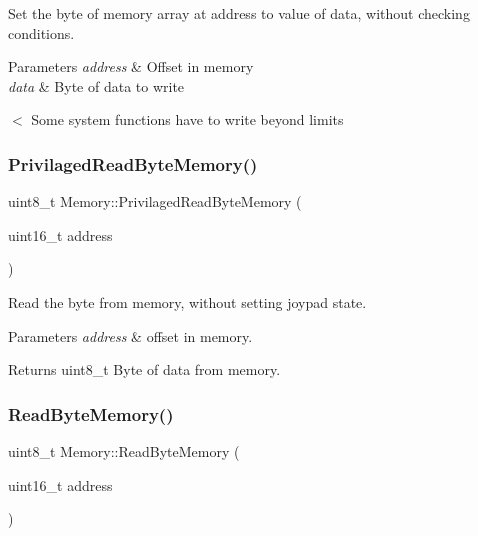 Set the byte of memory array at address to value of data, without checking conditions. 


\begin{DoxyParams}{Parameters}
{\em address} & Offset in memory \\
\hline
{\em data} & Byte of data to write \\
\hline
\end{DoxyParams}
$<$ Some system functions have to write beyond limits \mbox{\label{classMemory_a564d7bb2a8fc303f95af1a02756b882e}} 
\subsubsection{\texorpdfstring{Privilaged\+Read\+Byte\+Memory()}{PrivilagedReadByteMemory()}}
{\footnotesize\ttfamily uint8\+\_\+t Memory\+::\+Privilaged\+Read\+Byte\+Memory (\begin{DoxyParamCaption}\item[{uint16\+\_\+t}]{address }\end{DoxyParamCaption})}



Read the byte from memory, without setting joypad state. 


\begin{DoxyParams}{Parameters}
{\em address} & offset in memory. \\
\hline
\end{DoxyParams}
\begin{DoxyReturn}{Returns}
uint8\+\_\+t Byte of data from memory. 
\end{DoxyReturn}
\mbox{\label{classMemory_a2f04d90cf6d05ab12b52c1d6aef862a4}} 
\subsubsection{\texorpdfstring{Read\+Byte\+Memory()}{ReadByteMemory()}}
{\footnotesize\ttfamily uint8\+\_\+t Memory\+::\+Read\+Byte\+Memory (\begin{DoxyParamCaption}\item[{uint16\+\_\+t}]{address }\end{DoxyParamCaption})}



